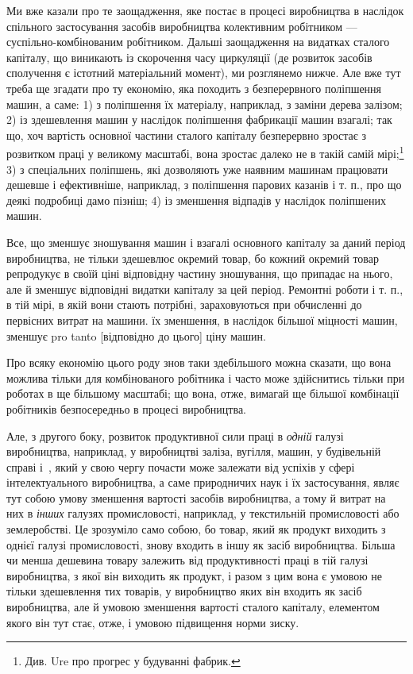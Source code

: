 Ми вже казали про те заощадження, яке постає в процесі
виробництва в наслідок спільного застосування засобів виробництва
колективним робітником — суспільно-комбінованим робітником.
Дальші заощадження на видатках сталого капіталу, що
виникають із скорочення часу циркуляції (де розвиток засобів
сполучення є істотний матеріальний момент), ми розглянемо
нижче. Але вже тут треба ще згадати про ту економію, яка
походить з безперервного поліпшення машин, а саме: 1) з поліпшення
їх матеріалу, наприклад, з заміни дерева залізом; 2) із
здешевлення машин у наслідок поліпшення фабрикації машин
взагалі; так що, хоч вартість основної частини сталого капіталу
безперервно зростає з розвитком праці у великому масштабі,
вона зростає далеко не в такій самій мірі;\footnote{
Див. Ure про прогрес у будуванні фабрик.
} 3) з спеціальних поліпшень,
які дозволяють уже наявним машинам працювати дешевше
і ефективніше, наприклад, з поліпшення парових казанів
і т. п., про що деякі подробиці дамо пізніш; 4) із зменшення
відпадів у наслідок поліпшених машин.

Все, що зменшує зношування машин і взагалі основного капіталу
за даний період виробництва, не тільки здешевлює окремий
товар, бо кожний окремий товар репродукує в своїй ціні
відповідну частину зношування, що припадає на нього, але
й зменшує відповідні видатки капіталу за цей період. Ремонтні
роботи і т. п., в тій мірі, в якій вони стають потрібні, зараховуються
при обчисленні до первісних витрат на машини. їх зменшення,
в наслідок більшої міцності машин, зменшує pro tanto
[відповідно до цього] ціну машин.

Про всяку економію цього роду знов таки здебільшого можна
сказати, що вона можлива тільки для комбінованого робітника
і часто може здійснитись тільки при роботах в ще більшому
масштабі; що вона, отже, вимагай ще більшої комбінації робітників
безпосередньо в процесі виробництва.

Але, з другого боку, розвиток продуктивної сили праці
в \emph{одній} галузі виробництва, наприклад, у виробництві заліза,
вугілля, машин, у будівельній справі і~, який у свою чергу
почасти може залежати від успіхів у сфері інтелектуального
виробництва, а саме природничих наук і їх застосування, являє
тут собою умову зменшення вартості засобів виробництва, а тому
й витрат на них в \emph{інших} галузях промисловості, наприклад,
у текстильній промисловості або землеробстві. Це зрозуміло
само собою, бо товар, який як продукт виходить з однієї галузі
промисловості, знову входить в іншу як засіб виробництва.
Більша чи менша дешевина товару залежить від продуктивності
праці в тій галузі виробництва, з якої він виходить як продукт,
і разом з цим вона є умовою не тільки здешевлення тих товарів,
у виробництво яких він входить як засіб виробництва, але
й умовою зменшення вартості сталого капіталу, елементом якого
він тут стає, отже, і умовою підвищення норми зиску.

